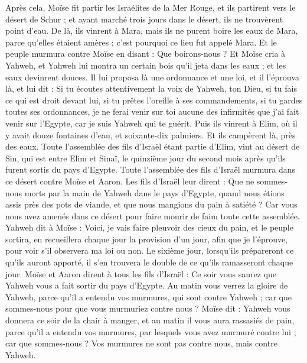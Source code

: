 \begin{multicols}{2}
Après cela, Moïse fit partir les Israélites de la Mer Rouge, et ils partirent vers le désert de Schur ; et ayant marché trois jours dans le désert, ils ne trouvèrent point d'eau.
De là, ils vinrent à Mara, mais ils ne purent boire les eaux de Mara, parce qu'elles étaient amères ; c'est pourquoi ce lieu fut appelé Mara.
Et le peuple murmura contre Moïse en disant : Que boirons-nous ?
Et Moïse cria à Yahweh, et Yahweh lui montra un certain bois qu'il jeta dans les eaux ; et les eaux devinrent douces. Il lui proposa là  une ordonnance et une loi, et il l'éprouva là,
et lui dit : Si tu écoutes attentivement la voix de Yahweh, ton Dieu, si tu fais ce qui est droit devant lui, si tu prêtes l'oreille à ses commandements, si tu gardes toutes ses ordonnances, je ne ferai venir sur toi aucune des infirmités que j'ai fait venir sur l'Egypte, car je suis Yahweh qui te guérit.
Puis ils vinrent à Elim, où il y avait douze fontaines d'eau, et soixante-dix palmiers. Et ils campèrent là, près des eaux.
\VerseOne{}Toute l'assemblée des fils d'Israël étant partie d'Elim, vint au désert de Sin, qui est entre Elim et Sinaï, le quinzième jour du second mois après qu'ils furent sortis du pays d'Egypte.
Toute l'assemblée des fils d'Israël murmura dans ce désert contre Moïse et Aaron.
Les fils d'Israël leur dirent : Que ne sommes-nous morts par la main de Yahweh dans le pays d'Egypte, quand nous étions assis près des pots de viande, et que nous mangions du pain à satiété ? Car vous nous avez amenés dans ce désert pour faire mourir de faim toute cette assemblée.
Yahweh dit à Moïse : Voici, je vais faire pleuvoir des cieux du pain, et le peuple sortira, en recueillera chaque jour la provision d'un jour, afin que je l'éprouve, pour voir s'il observera ma loi ou non.
Le sixième jour, lorsqu’ils prépareront ce qu’ils auront apporté, il s’en trouvera le double de ce qu’ils ramasseront chaque jour.
Moïse et Aaron dirent à tous les fils d'Israël : Ce soir vous saurez que Yahweh vous a fait sortir du pays d'Egypte.
Au matin vous verrez la gloire de Yahweh, parce qu'il a entendu vos murmures, qui sont contre Yahweh ; car que sommes-nous pour que vous murmuriez contre nous ?
Moïse dit : Yahweh vous donnera ce soir de la chair à manger, et au matin il vous aura rassasiés de pain, parce qu'il a entendu vos murmures, par lesquels vous avez murmuré contre lui ; car que sommes-nous ? Vos murmures ne sont pas contre nous, mais contre Yahweh.

\end{multicols}
